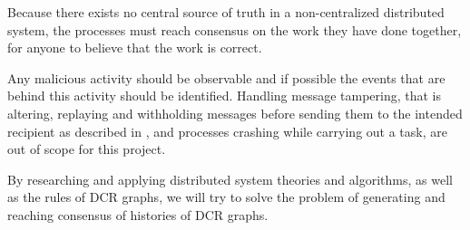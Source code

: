 	\newpar Because there exists no central source of truth in a non-centralized distributed system, the processes must reach consensus on the work they have done together, for anyone to believe that the work is correct.
	
	Any malicious activity should be observable and if possible the events that are behind this activity should be identified. Handling message tampering, that is altering, replaying and withholding messages before sending them to the intended recipient as described in \cite{Coulouris:2011:DSC:2029110:chapter2}, and processes crashing while carrying out a task, are out of scope for this project.

	\newpar By researching and applying distributed system theories and algorithms, as well as the rules of DCR graphs, we will try to solve the problem of generating and reaching consensus of histories of DCR graphs.